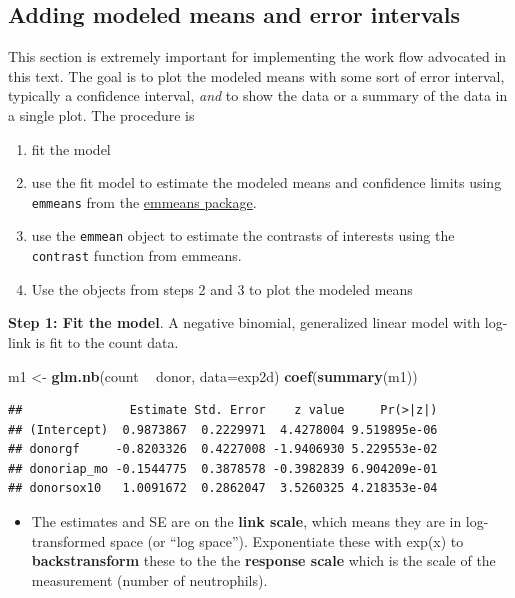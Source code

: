 \documentclass[]{book}
\newenvironment{Shaded}{\begin{snugshade}}{\end{snugshade}}
\newcommand{\DataTypeTok}[1]{\textcolor[rgb]{0.13,0.29,0.53}{#1}}
\newcommand{\KeywordTok}[1]{\textcolor[rgb]{0.13,0.29,0.53}{\textbf{#1}}}
\newcommand{\NormalTok}[1]{#1}
\newcommand{\OperatorTok}[1]{\textcolor[rgb]{0.81,0.36,0.00}{\textbf{#1}}}
\newcommand{\StringTok}[1]{\textcolor[rgb]{0.31,0.60,0.02}{#1}}
\providecommand{\tightlist}{%
  \setlength{\itemsep}{0pt}\setlength{\parskip}{0pt}}
\begin{document}
\hypertarget{adding-modeled-means-and-error-intervals}{%
\subsection{Adding modeled means and error intervals}\label{adding-modeled-means-and-error-intervals}}

This section is extremely important for implementing the work flow advocated in this text. The goal is to plot the modeled means with some sort of error interval, typically a confidence interval, \emph{and} to show the data or a summary of the data in a single plot. The procedure is

\begin{enumerate}
\def\labelenumi{\arabic{enumi}.}
\tightlist
\item
  fit the model
\item
  use the fit model to estimate the modeled means and confidence limits using \texttt{emmeans} from the \href{https://cran.r-project.org/web/packages/emmeans/index.html}{emmeans package}.
\item
  use the \texttt{emmean} object to estimate the contrasts of interests using the \texttt{contrast} function from emmeans.
\item
  Use the objects from steps 2 and 3 to plot the modeled means
\end{enumerate}

\textbf{Step 1: Fit the model}. A negative binomial, generalized linear model with log-link is fit to the count data.

\begin{Shaded}
\begin{Highlighting}[]
\NormalTok{m1 <-}\StringTok{ }\KeywordTok{glm.nb}\NormalTok{(count }\OperatorTok{~}\StringTok{ }\NormalTok{donor, }\DataTypeTok{data=}\NormalTok{exp2d)}
\KeywordTok{coef}\NormalTok{(}\KeywordTok{summary}\NormalTok{(m1))}
\end{Highlighting}
\end{Shaded}

\begin{verbatim}
##               Estimate Std. Error    z value     Pr(>|z|)
## (Intercept)  0.9873867  0.2229971  4.4278004 9.519895e-06
## donorgf     -0.8203326  0.4227008 -1.9406930 5.229553e-02
## donoriap_mo -0.1544775  0.3878578 -0.3982839 6.904209e-01
## donorsox10   1.0091672  0.2862047  3.5260325 4.218353e-04
\end{verbatim}

\begin{itemize}
\tightlist
\item
  The estimates and SE are on the \textbf{link scale}, which means they are in log-transformed space (or ``log space''). Exponentiate these with exp(x) to \textbf{backstransform} these to the the \textbf{response scale} which is the scale of the measurement (number of neutrophils).
\end{itemize}
\end{document}

